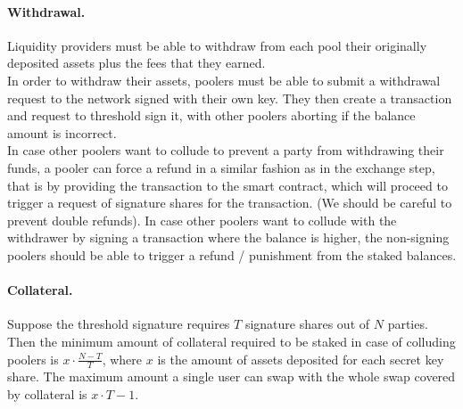 \paragraph*{Withdrawal.}
Liquidity providers must be able to withdraw from each pool their originally deposited assets plus the fees that they earned.  \\
In order to withdraw their assets, poolers must be able to submit a withdrawal request to the network signed with their own key. They then create a transaction and request to threshold sign it, with other poolers aborting if the balance amount is incorrect. \\
In case other poolers want to collude to prevent a party from withdrawing their funds, a pooler can force a refund in a similar fashion as in the exchange step, that is by providing the transaction to the smart contract, which will proceed to trigger a request of signature shares for the transaction. (We should be careful to prevent double refunds).
In case other poolers want to collude with the withdrawer by signing a transaction where the balance is higher, the non-signing poolers should be able to trigger a refund / punishment from the staked balances.
\paragraph*{Collateral.}
Suppose the threshold signature requires $T$ signature shares out of $N$ parties. Then the minimum amount of collateral required to be staked in case of colluding poolers is $x \cdot \frac{N-T}{T}$, where $x$ is the amount of assets deposited for each secret key share.
The maximum amount a single user can swap with the whole swap covered by collateral is $x \cdot T-1$.
